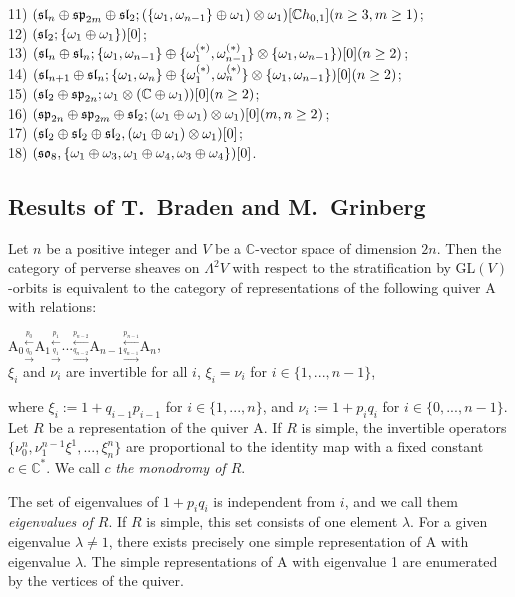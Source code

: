 \documentclass[12pt]{amsart}
\theoremstyle{definition}\newtheorem{theorem}{Theorem}[section]
\theoremstyle{definition}\newtheorem{definition}[proposition]{Definition}
\theoremstyle{remark}\newtheorem{example}[proposition]{Example}
\begin{document}
11) $(\frak{sl}_n\oplus\frak{sp}_{2m}\oplus\frak{sl}_2; (\{\omega_1, \omega_{n-1}\}\oplus\omega_1)\otimes\omega_1) [\mathbb Ch_{0,1}](n\ge 3, m\ge 1)$;\\
12) $(\frak{sl}_2; \{\omega_1\oplus\omega_1\}) [0]$;\\
13) $(\frak{sl}_n\oplus\frak{sl}_n; \{\omega_1, \omega_{n-1}\}\oplus\{\omega_1^{(*)}, \omega_{n-1}^{(*)}\}\otimes\{\omega_1, \omega_{n-1}\}) [0](n\ge 2)$;\\
14) $(\frak{sl}_{n+1}\oplus\frak{sl}_n; \{\omega_1, \omega_n\}\oplus\{\omega_1^{(*)}, \omega_n^{(*)}\}\otimes\{\omega_1, \omega_{n-1}\}) [0](n\ge 2)$;\\
15) $(\frak{sl}_2\oplus\frak{sp}_{2n}; \omega_1\otimes(\mathbb C\oplus\omega_1)) [0](n\ge 2)$;\\
16) $(\frak{sp}_{2n}\oplus\frak{sp}_{2m}\oplus\frak{sl}_2; (\omega_1\oplus \omega_1)\otimes\omega_1) [0] (m, n\ge2)$;\\
17) $(\frak{sl}_2\oplus\frak{sl}_2\oplus\frak{sl}_2, (\omega_1\oplus\omega_1)\otimes\omega_1) [0]$;\\
18) $(\frak{so}_8, \{\omega_1\oplus\omega_3, \omega_1\oplus\omega_4, \omega_3\oplus\omega_4\}) [0]$.
\subsection{Results of T.~Braden and M.~Grinberg}Let $n$ be a positive integer and $V$ be a $\mathbb C$-vector space of dimension $2n$. Then the category of perverse sheaves on $\Lambda^2V$ with respect to the stratification by GL$(V)$-orbits is equivalent to the category of representations of the following quiver A with relations:\begin{center}{\Large A$_0$}$_{\xrightarrow{q_0}}^{\xleftarrow{p_0}}${\Large A$_1$}$_{\xrightarrow{q_1}}^{\xleftarrow{p_1}}$...$_{\xrightarrow{q_{n-2}}}^{\xleftarrow{p_{n-2}}}${\Large A$_{n-1}$}$_{\xrightarrow{q_{n-1}}}^{\xleftarrow{p_{n-1}}}${\Large A$_n$},\\ $\xi_i$ and $\nu_i$ are invertible for all $i$, $\xi_i=\nu_i$ for $i\in\{1,..., n-1\}$,\end{center}where $\xi_i:=1+q_{i-1}p_{i-1}$ for $i\in\{1,..., n\}$, and $\nu_i:=1+p_iq_i$ for $i\in\{0,..., n-1\}$. Let $R$ be a representation of the quiver A.  If $R$ is simple, the invertible operators $\{\nu_0^n, \nu_1^{n-1}\xi^1,..., \xi_n^n\}$ are proportional to the identity map with a fixed constant $c\in\mathbb C^*$. We call $c$ {\it the monodromy of $R$}.

The set of eigenvalues of $1+p_iq_i$ is independent from $i$, and we call them {\it eigenvalues of $R$}. If $R$ is simple, this set consists of one element $\lambda$. For a given eigenvalue $\lambda\ne 1$, there exists precisely one simple representation of A with eigenvalue $\lambda$. The simple representations of A with eigenvalue 1 are enumerated by the vertices of the quiver.
\end{document}
